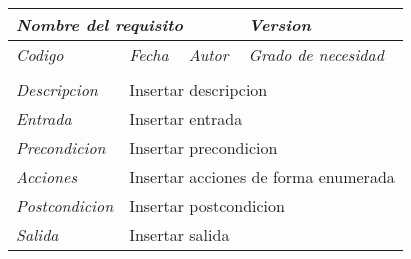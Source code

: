 \begin{tabular}{|p{3cm}|p{3cm}|p{3cm}|p{3cm}|}
\hline \multicolumn{3}{|p{9cm}|}{\textit{Nombre del requisito}} & \textit{Version} \\
\hline \textit{Codigo} & \textit{Fecha} & \textit{Autor} & \textit{Grado de necesidad} \\
& & & \\
\hline \textit{Descripcion} & \multicolumn{3}{|p{9cm}|}{Insertar descripcion} \\
\hline \textit{Entrada} & \multicolumn{3}{|p{9cm}|}{Insertar entrada} \\
\hline \textit{Precondicion} & \multicolumn{3}{|p{9cm}|}{Insertar precondicion} \\
\hline \textit{Acciones} & \multicolumn{3}{|p{9cm}|}{Insertar acciones de forma enumerada} \\
\hline \textit{Postcondicion} & \multicolumn{3}{|p{9cm}|}{Insertar postcondicion} \\
\hline \textit{Salida} & \multicolumn{3}{|p{9cm}|}{Insertar salida} \\ \hline
\end{tabular}